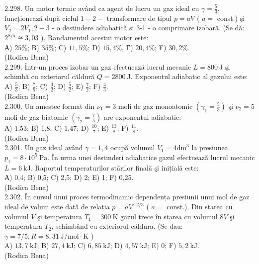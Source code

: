 \documentclass[10pt]{article}
\begin{document}
2.298. Un motor termic având ca agent de lucru un gaz ideal cu $\gamma=\frac{5}{3}$, funcționează după ciclul $1-2-$ transformare de tipul $p=a V$ ( $a=$ const.) şi $V_{2}=2 V_{1}, 2-3$ - o destindere adiabatică si 3-1 - o comprimare izobară. (Se dă: $2^{8 / 5} \cong 3,03$ ). Randamentul acestui motor este:\\ А) $25 \%$; B) $35 \%$; C) $11,5 \%$; D) $15,4 \%$, Е) $20,4 \%$; F) $30,2 \%$.\\ (Rodica Bena)\\

2.299. Într-un proces izobar un gaz efectuează lucrul mecanic $L=800 \mathrm{~J}$ şi schimbă cu exteriorul căldură $Q=2800 \mathrm{~J}$. Exponentul adiabatic al gazului este:\\ A) $\frac{5}{3}$; B) $\frac{7}{5}$; C) $\frac{3}{2}$; D) $\frac{5}{2}$; E) $\frac{7}{2}$; F) $\frac{4}{3}$.\\ (Rodica Bena)\\

2.300. Un amestec format din $\nu_{1}=3$ moli de gaz monoatomic $\left(\gamma_{1}=\frac{5}{3}\right)$ şi $\nu_{2}=5$ moli de gaz biatomic $\left(\gamma_{2}=\frac{7}{5}\right)$ are exponentul adiabatic:\\ А) 1,53; B) 1,8; C) 1,47; D) $\frac{10}{7}$; E) $\frac{13}{8}$; F) $\frac{11}{8}$.\\ (Rodica Bena)\\

2.301. Un gaz ideal având $\gamma=1,4$ ocupă volumul $V_{1}=4 \mathrm{dm}^{3}$ la presiunea $p_{1}=8 \cdot 10^{5} \mathrm{~Pa}$. În urma unei destinderi adiabatice gazul efectuează lucrul mecanic $L=6 \mathrm{~kJ}$. Raportul temperaturilor stărilor finală şi inițială este:\\ А) 0,4; B) 0,5; C) 2,5; D) 2; E) 1; F) 0,25.\\ (Rodica Bena)\\

2.302. În cursul unui proces termodinamic dependența presiunii unui mol de gaz ideal de volum este dată de relația $p=a V^{-2 / 3}$ ( $a=$ const.). Din starea cu volumul $V$ şi temperatura $T_{1}=300 \mathrm{~K}$ gazul trece în starea cu volumul $8 V$ şi temperatura $T_{2}$, schimbând cu exteriorul căldura. (Se dau: $\gamma=7 / 5 ; R=8,31 \mathrm{~J} / \mathrm{mol} \cdot \mathrm{K}$ )\\ A) $13,7 \mathrm{~kJ}$; B) $27,4 \mathrm{~kJ}$; C) $6,85 \mathrm{~kJ}$; D) $4,57 \mathrm{~kJ}$; E) 0; F) $5,2 \mathrm{~kJ}$.\\ (Rodica Bena)\\
\end{document}
